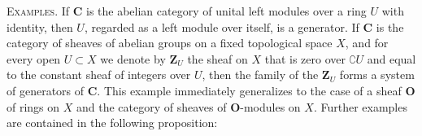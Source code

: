 \textsc{Examples.} If $\mathbf{C}$ is the abelian category of unital left
modules over a ring $U$ with identity, then $U$, regarded as a left module over
itself, is a generator. If $\mathbf{C}$ is the category of sheaves of abelian groups on
a fixed topological space $X$, and for every open $U\subset X$ we denote by
$\mathbf{Z}_U$ the sheaf on $X$ that is zero over $\complement U$ and equal to the
constant sheaf of integers over $U$, then the family of the $\mathbf{Z}_U$ forms a
system of generators of $\mathbf{C}$. This example immediately generalizes to the case
of a sheaf $\mathbf{O}$ of rings on $X$ and the category of sheaves of $\mathbf{O}$-modules on
$X$. Further examples are contained in the following proposition:


